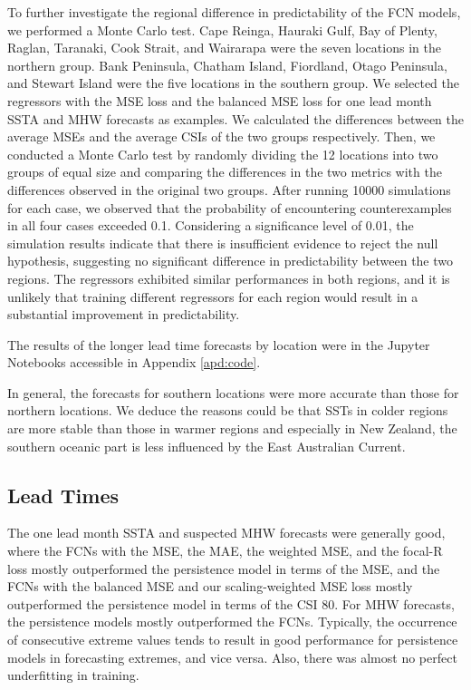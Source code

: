 \documentclass[11pt, a4paper]{article}
\begin{document}
To further investigate the regional difference in predictability of the FCN models, we performed a Monte Carlo test. Cape Reinga, Hauraki Gulf, Bay of Plenty, Raglan, Taranaki, Cook Strait, and Wairarapa were the seven locations in the northern group. Bank Peninsula, Chatham Island, Fiordland, Otago Peninsula, and Stewart Island were the five locations in the southern group. We selected the regressors with the MSE loss and the balanced MSE loss for one lead month SSTA and MHW forecasts as examples. We calculated the differences between the average MSEs and the average CSIs of the two groups respectively. Then, we conducted a Monte Carlo test by randomly dividing the 12 locations into two groups of equal size and comparing the differences in the two metrics with the differences observed in the original two groups. After running 10000 simulations for each case, we observed that the probability of encountering counterexamples in all four cases exceeded 0.1. Considering a significance level of 0.01, the simulation results indicate that there is insufficient evidence to reject the null hypothesis, suggesting no significant difference in predictability between the two regions. The regressors exhibited similar performances in both regions, and it is unlikely that training different regressors for each region would result in a substantial improvement in predictability.

The results of the longer lead time forecasts by location were in the Jupyter Notebooks accessible in Appendix \ref{apd:code}.

In general, the forecasts for southern locations were more accurate than those for northern locations. We deduce the reasons could be that SSTs in colder regions are more stable than those in warmer regions and especially in New Zealand, the southern oceanic part is less influenced by the East Australian Current.

\subsection{Lead Times}

The one lead month SSTA and suspected MHW forecasts were generally good, where the FCNs with the MSE, the MAE, the weighted MSE, and the focal-R loss mostly outperformed the persistence model in terms of the MSE, and the FCNs with the balanced MSE and our scaling-weighted MSE loss mostly outperformed the persistence model in terms of the CSI 80. For MHW forecasts, the persistence models mostly outperformed the FCNs. Typically, the occurrence of consecutive extreme values tends to result in good performance for persistence models in forecasting extremes, and vice versa. Also, there was almost no perfect underfitting in training.
\end{document}
